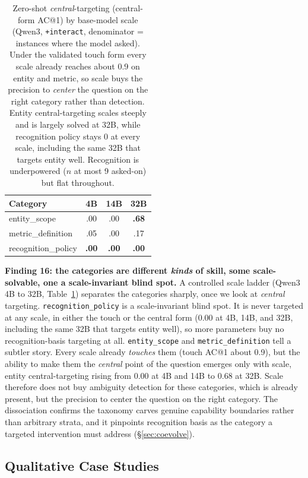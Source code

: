 \begin{table}[t]
\centering
\caption{Zero-shot \emph{central}-targeting (central-form AC@1) by base-model scale
(Qwen3, \texttt{+interact}, denominator = instances where the model asked). Under the
validated touch form every scale already reaches about 0.9 on entity and metric, so scale
buys the precision to \emph{center} the question on the right category rather than detection.
Entity central-targeting scales steeply and is largely solved at 32B, while recognition policy
stays 0 at every scale, including the same 32B that targets entity well. Recognition is
underpowered ($n$ at most 9 asked-on) but flat throughout.}
\label{tab:scaledissoc}
\small
\begin{tabular}{lccc}
\toprule
Category & 4B & 14B & 32B \\
\midrule
entity\_scope       & .00 & .00 & \textbf{.68} \\
metric\_definition  & .05 & .00 & .17 \\
recognition\_policy & \textbf{.00} & \textbf{.00} & \textbf{.00} \\
\bottomrule
\end{tabular}
\end{table}

\textbf{Finding 16: the categories are different \emph{kinds} of skill, some
scale-solvable, one a scale-invariant blind spot.} A controlled scale ladder
(Qwen3 4B to 32B, Table~\ref{tab:scaledissoc}) separates the categories
sharply, once we look at \emph{central} targeting. \texttt{recognition\_policy} is a
scale-invariant blind spot. It is never targeted at any scale, in either the touch or the
central form (0.00 at 4B, 14B, and 32B, including the same 32B that targets entity well),
so more parameters buy no recognition-basis targeting at all. \texttt{entity\_scope} and
\texttt{metric\_definition} tell a subtler story. Every scale already \emph{touches} them
(touch AC@1 about 0.9), but the ability to make them the \emph{central} point of the
question emerges only with scale, entity central-targeting rising from 0.00 at 4B and 14B to
0.68 at 32B. Scale therefore does not buy ambiguity detection for these categories, which is
already present, but the precision to center the question on the right category. The dissociation
confirms the taxonomy carves genuine capability boundaries rather than arbitrary strata, and
it pinpoints recognition basis as the category a targeted intervention must address
(\S\ref{sec:coevolve}).

\subsection{Qualitative Case Studies}
\label{sec:casestudies}

